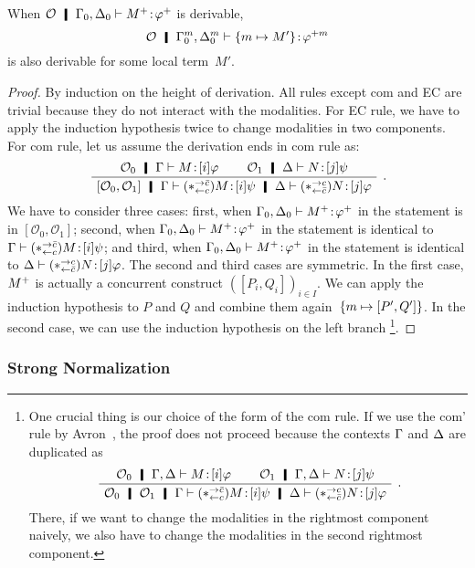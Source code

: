   \begin{proposition}
   \label{process-change}
  When $\mathcal O \hmid \G_0,\D_0\tr\tj{\m{M}}{\m\phi}$ is derivable,
  \[
   \mathcal O\hmid \G_0^m, \D_0^m\tr\tj{\mmapsto{M'}}{\phi^{+m}}
  \] is also
  derivable for some local term~$M'$.
  \end{proposition}
  \begin{proof}
   By induction on the height of derivation.
   All rules except com and EC are trivial because
   they do not interact
   with the modalities.  For EC rule, we have to apply the induction
   hypothesis twice to change modalities in two components.
   For com rule, let us assume the derivation ends in com rule as:
   \[
   \BinaryRule
   {$\hypert_0\hmid\G\tr\tj{M}{[i]\varphi}$}
   {$\hypert_1\hmid\D\tr\tj{N}{[j]\psi}$}
   {}
   {$\cotuple{\hypert_0,\hypert_1}\hmid\Gamma\tr\tj{(\comodL)M}{[i]\psi}\hmid
   \Delta\tr\tj{(\comodR)N}{[j]\varphi}$}\enspace.
   \]
   We have to consider three cases:  first, when
   $\Gamma_0,\Delta_0\vdash{{M}^+} \mathord{\colon\kern -2pt}{{\varphi}^+}$ in the statement is in $[\mathcal O_0, \mathcal O_1]$;
   second, when $\Gamma_0,\Delta_0\vdash{{M}^+} \mathord{\colon\kern -2pt}{{\varphi}^+}$ in the statement is identical to
   $\Gamma\vdash{(\ast^{\rightarrow {\bar{c}}}_{\leftarrow{c}})M} \mathord{\colon\kern -2pt}{[i]\psi} $; and third,
   when $\Gamma_0,\Delta_0\vdash{{M}^+} \mathord{\colon\kern -2pt}{{\varphi}^+}$ in the statement is identical to
   $\Delta\vdash{(\ast^{\rightarrow {c}}_{\leftarrow{\bar{c}}})N} \mathord{\colon\kern -2pt}{[j]\varphi}$.
   The second and third cases are symmetric.  In the first case, ${M}^+$ is
   actually a concurrent construct $([P_i,Q_i])_{i\in I}$. We can apply the
   induction hypothesis to $P$ and $Q$ and combine them
   again~$\{m\mapsto {[{P', Q'}]}\}$.
   In the second case, we can use the induction hypothesis on the left branch%
   \footnote{One crucial thing is our choice of the form of the com rule.
   If we use the com' rule by Avron~\cite{avron91}, the proof does not
   proceed because the contexts $\Gamma$ and $\Delta$ are duplicated as
   \[
   \BinaryRule
   {$\hypert_0\hmid\G,\D\tr\tj{M}{[i]\varphi}$}
   {$\hypert_1\hmid\G,\D\tr\tj{N}{[j]\psi}$}
   {}
   {$\hypert_0\hmid\hypert_1\hmid\G\tr\tj{(\comodL)M}{[i]\psi}\hmid
   \D\tr\tj{(\comodR)N}{[j]\varphi}$}\enspace.
   \]
   There, if we want to change the modalities in the rightmost component
   naively, we also have to change the modalities in the second
   rightmost component.
   }.
  \end{proof}

\subsubsection{Strong Normalization}
\newcommand{\sreduce}{\leadsto}

